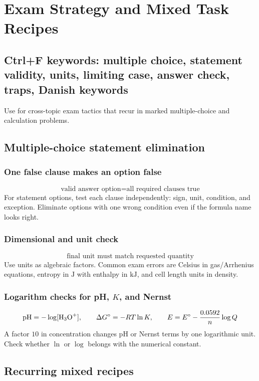 \section{Exam Strategy and Mixed Task Recipes}

\subsection{Ctrl+F keywords: multiple choice, statement validity, units, limiting case, answer check, traps, Danish keywords}
Use for cross-topic exam tactics that recur in marked multiple-choice and calculation problems.

\subsection{Multiple-choice statement elimination}

\subsubsection{One false clause makes an option false}
\[
\text{valid answer option}=\text{all required clauses true}
\]
For statement options, test each clause independently: sign, unit, condition, and exception. Eliminate options with one wrong condition even if the formula name looks right.

\subsubsection{Dimensional and unit check}
\[
\text{final unit must match requested quantity}
\]
Use units as algebraic factors. Common exam errors are Celsius in gas/Arrhenius equations, entropy in \(\mathrm J\) with enthalpy in \(\mathrm{kJ}\), and cell length units in density.

\subsubsection{Logarithm checks for pH, \(K\), and Nernst}
\[
\mathrm{pH}=-\log[\ce{H3O+}], \qquad
\Delta G^\circ=-RT\ln K, \qquad
E=E^\circ-\frac{0.0592}{n}\log Q
\]
A factor \(10\) in concentration changes pH or Nernst terms by one logarithmic unit. Check whether \(\ln\) or \(\log\) belongs with the numerical constant.

\subsection{Recurring mixed recipes}

